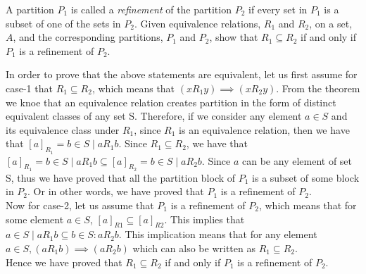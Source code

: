 \documentclass[addpoints]{exam}
\begin{document}
\begin{questions}
\begin{solution}

  \end{solution}

\question[5] A partition $P_1$ is called a \textit{refinement} of the partition $P_2$ if every set in $P_1$ is a subset of one of the sets in $P_2$. Given equivalence relations, $R_1$ and $R_2$, on a set, $A$, and the corresponding partitions, $P_1$ and $P_2$, show that $R_1 \subseteq R_2$ if and only if $P_1$ is a refinement of $P_2$.
  \begin{solution}
    In order to prove that the above statements are equivalent, let us first assume for case-1 that $R_1 \subseteq R_2$, which means that $(xR_1y)\implies (xR_2y)$. From the theorem we knoe that an equivalence relation creates partition in the form of distinct equivalent classes of any set S. Therefore, if we consider any element $a \in S$ and its equivalence class under $R_1$, since $R_1$ is an equivalence relation, then we have that $[a]_{R_1} = b \in S \mid aR_1b$. Since $R_1 \subseteq R_2$, we have that $[a]_{R_1} = b \in S \mid aR_1b \subseteq [a]_{R_2} = b \in S \mid aR_2b$. 
    Since $a$ can be any element of set S, thus we have proved that all the partition block of $P_1$ is a subset of some block in $P_2$. Or in other words, we have proved that $P_1$ is a refinement of $P_2$.\\
    Now for case-2, let us assume that $P_1$ is a refinement of $P_2$, which means that for some element $a\in S$, $[a]_{R1}\subseteq [a]_{R2}$. This implies that ${a\in S \mid aR_{1}b} \subseteq {b\in S:aR_{2}b}$. This implication means that for any element $a\in S,(aR_{1}b)\implies (aR_{2}b)$ which can also be written as $R_1 \subseteq R_2$. \\
    Hence we have proved that $R_1 \subseteq R_2$ if and only if $P_1$ is a refinement of $P_2$.
  \end{solution}


\end{questions}
\end{document}
